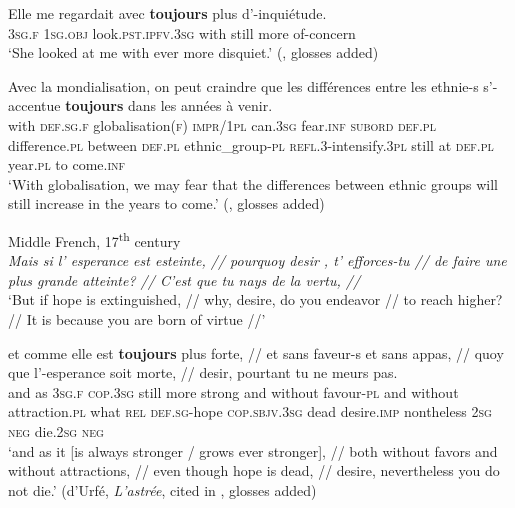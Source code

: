 \begin{exe}
	\ex\label{exApppendixFrenchToujoursComparisons1}
	\gll Elle me regardait avec \textbf{toujours} plus d'-inquiétude.\\
	3\textsc{sg}.\textsc{f} 1\textsc{sg}.\textsc{obj} look.\textsc{pst}.\textsc{ipfv}.3\textsc{sg} with still more of-concern\\
	\glt \lq She looked at me with ever more disquiet.\rq{ }(\cite[164]{MosegaardHansen2008}, glosses added)
	
	\ex\label{exApppendixFrenchToujoursComparisons2}
	\gll Avec la mondialisation, on peut craindre que les différences entre les ethnie-s s’-accentue  \textbf{toujours} dans les années à venir.\\
	with \textsc{def}.\textsc{sg}.\textsc{f} globalisation(\textsc{f}) \textsc{impr}/1\textsc{pl} can.3\textsc{sg} fear.\textsc{inf} \textsc{subord} \textsc{def}.\textsc{pl} difference.\textsc{pl} between \textsc{def}.\textsc{pl} ethnic\_group-\textsc{pl} \textsc{refl}.3-intensify.3\textsc{pl} still at \textsc{def}.\textsc{pl} year.\textsc{pl} to come.\textsc{inf}\\
	\glt \lq With globalisation, we may fear that the differences between ethnic groups will still increase in the years to come.\rq{ }(\cite[165]{MosegaardHansen2008}, glosses added)
	
	\ex Middle French, 17\textsuperscript{th} century\label{exApppendixFrenchToujoursComparisons3}\\
	\textit{Mais si l’ esperance est esteinte, // pourquoy desir , t’ efforces-tu // de faire une plus grande atteinte? // C’est que tu nays de la vertu, //}\\
	\lq But if hope is extinguished, // why, desire, do you endeavor // to reach higher? // It is because you are born of virtue //\rq{}
	
	\sn\gll 	et comme elle est \textbf{toujours} plus forte, // et sans faveur-s et sans appas, // quoy que l’-esperance soit morte, // desir, pourtant tu ne meurs pas.\\
	and as 3\textsc{sg}.\textsc{f} \textsc{cop}.3\textsc{sg} still more strong {} and without favour-\textsc{pl} and without attraction.\textsc{pl} {} what \textsc{rel} \textsc{def}.\textsc{sg}-hope \textsc{cop}.\textsc{sbjv}.3\textsc{sg} dead {} desire.\textsc{imp} nontheless 2\textsc{sg} \textsc{neg} die.2\textsc{sg} \textsc{neg}\\
	\glt \lq and as it [is always stronger / grows ever stronger], // both without favors and without attractions, // even though hope is dead, // desire, nevertheless you do not die.\rq{ }(d'Urfé, \textit{L’astrée}, cited in \cite[167]{MosegaardHansen2008}, glosses added)
\end{exe}


